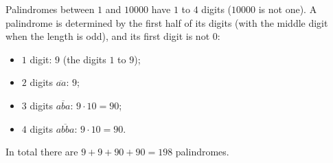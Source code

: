 Palindromes between $1$ and $10000$ have $1$ to $4$ digits ($10000$ is not one). A palindrome is determined by the first half of its digits (with the middle digit when the length is odd), and its first digit is not $0$:
\begin{itemize}
\item $1$ digit: $9$ (the digits $1$ to $9$);
\item $2$ digits $\overline{aa}$: $9$;
\item $3$ digits $\overline{aba}$: $9\cdot10=90$;
\item $4$ digits $\overline{abba}$: $9\cdot10=90$.
\end{itemize}
In total there are $9+9+90+90=\boxed{198}$ palindromes.
